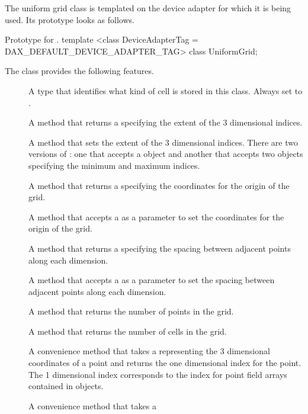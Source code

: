 The uniform grid class is templated on the device adapter for which it is
being used. Its prototype looks as follows.

\begin{daxexample}{Prototype for \protect{}.}
template <class DeviceAdapterTag = DAX_DEFAULT_DEVICE_ADAPTER_TAG>
class UniformGrid;
\end{daxexample}

The  class provides the following features.
\begin{description}
\item[] A type that identifies what kind of cell is
  stored in this class. Always set to .
\item[] A method that returns a 
  specifying the extent of the 3 dimensional indices.
\item[] A method that sets the extent of the 3
  dimensional indices. There are two versions of : one
  that accepts a  object and another that accepts two
   objects specifying the minimum and maximum indices.
\item[] A method that returns a 
  specifying the coordinates for the origin of the grid.
\item[] A method that accepts a  as a
  parameter to set the coordinates for the origin of the grid.
\item[] A method that returns a 
  specifying the spacing between adjacent points along each dimension.
\item[] A method that accepts a  as a
  parameter to set the spacing between adjacent points along each
  dimension.
\item[] A method that returns the number of
  points in the grid.
\item[] A method that returns the number of
  cells in the grid.
\item[] A convenience method that takes a
   representing the 3 dimensional coordinates of a point and
  returns the one dimensional index for the point. The 1 dimensional index
  corresponds to the index for point field arrays contained in
   objects.
\item[] A convenience method that takes a

\end{description}
